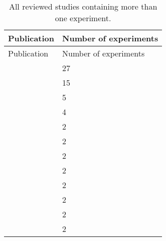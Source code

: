 \startrowcolors
\begin{longtable}{p{6cm}|l}
\caption{All reviewed studies containing more than one experiment.} \\
\hline
\rowcolor{white}
Publication & Number of experiments\\ \hline
\endfirsthead
\hline
\rowcolor{white}
Publication & Number of experiments\\ \hline
\endhead
\hline
\endfoot
\citet{Kapplinger2015MutationDB} & 27 \\
\citet{Tan2005MutationDB} & 15 \\
\citet{Abriel2001MutationDB} & 5 \\
\citet{Cheng2010MutationDB} & 4 \\
\citet{Ye2003MutationDB} & 2 \\
\citet{Watanabe2011bMutationDB} & 2 \\
\citet{Tan2006MutationDB} & 2 \\
\citet{Swan2014MutationDB} & 2 \\
\citet{Hu2015MutationDB} & 2 \\
\citet{Cheng2011MutationDB} & 2 \\
\citet{Calloe2011MutationDB} & 2 \\
\citet{An1998MutationDB} & 2 \\
\end{longtable}

